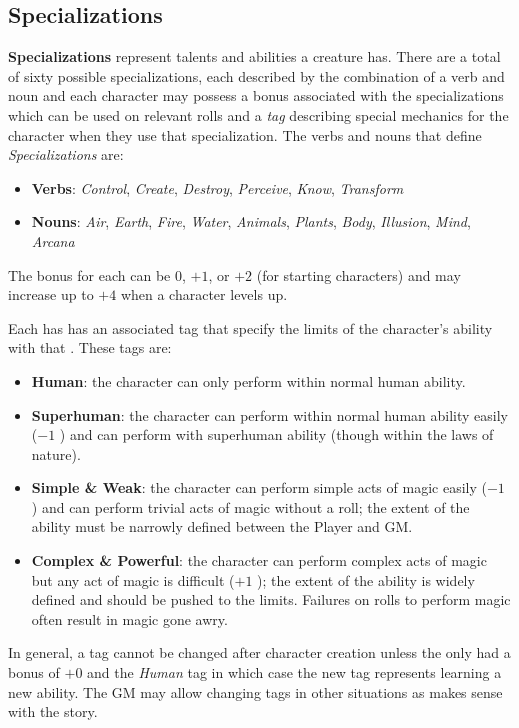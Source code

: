 \subsection{Specializations}
\textbf{Specializations} represent talents and abilities a creature has.
There are a total of sixty possible specializations, each described by the combination of a verb and noun and each character may possess a bonus associated with the specializations which can be used on relevant rolls and a \emph{tag} describing special mechanics for the character when they use that specialization.
The verbs and nouns that define \emph{Specializations} are:
\begin{itemize}
  \item \textbf{Verbs}: \emph{Control}, \emph{Create}, \emph{Destroy}, \emph{Perceive}, \emph{Know}, \emph{Transform}
  \item \textbf{Nouns}: \emph{Air}, \emph{Earth}, \emph{Fire}, \emph{Water}, \emph{Animals}, \emph{Plants}, \emph{Body}, \emph{Illusion}, \emph{Mind}, \emph{Arcana}
\end{itemize}
The bonus for each \Specialization{} can be $0$, $+1$, or $+2$ (for starting characters) and may increase up to $+4$ when a character levels up.

Each \Specialization{} has has an associated tag that specify the limits of the character's ability with that \Specialization.
These tags are:
\begin{itemize}
  \item \textbf{Human}: the character can only perform within normal human ability.
  \item \textbf{Superhuman}: the character can perform within normal human ability easily ($-1$ \Difficulty\footnotemark) and can perform with superhuman ability (though within the laws of nature).
  \item \textbf{Simple \& Weak}: the character can perform simple acts of magic easily ($-1$ \Difficulty) and can perform trivial acts of magic without a roll; the extent of the ability must be narrowly defined between the Player and GM.
  \item \textbf{Complex \& Powerful}: the character can perform complex acts of magic but any act of magic is difficult ($+1$ \Difficulty); the extent of the ability is widely defined and should be pushed to the limits. Failures on rolls to perform magic often result in magic gone awry.
\end{itemize}
In general, a tag cannot be changed after character creation unless the \Specialization{} only had a bonus of $+0$ and the \emph{Human} tag in which case the new tag represents learning a new ability.
The GM may allow changing tags in other situations as makes sense with the story.

